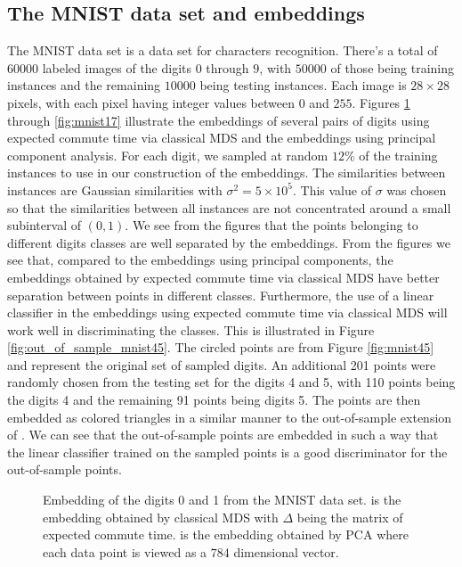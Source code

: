 \subsection{The MNIST data set and embeddings}
The MNIST data set \citep{lecun98:_gradien} is a data set for
characters recognition. There's a total of $60000$ labeled images of
the digits $0$ through $9$, with $50000$ of those being training
instances and the remaining $10000$ being testing instances. Each
image is $28 \times 28$ pixels, with each pixel having integer values
between $0$ and $255$. Figures \ref{fig:mnist01} through
\ref{fig:mnist17} illustrate the embeddings of several pairs of digits
using expected commute time via classical MDS and the embeddings using
principal component analysis. For each digit, we sampled at random
$12$\% of the training instances to use in our construction of the
embeddings. The similarities between instances are Gaussian
similarities with $\sigma^2 = 5 \times 10^5$. This value of $\sigma$
was chosen so that the similarities between all instances are not
concentrated around a small subinterval of $(0,1)$. We see from the
figures that the points belonging to different digits classes are well
separated by the embeddings. From the figures we see that, compared to
the embeddings using principal components, the embeddings obtained by
expected commute time via classical MDS have better separation between
points in different classes.  Furthermore, the use of a linear
classifier in the embeddings using expected commute time via classical
MDS will work well in discriminating the classes. This is illustrated
in Figure \ref{fig:out_of_sample_mnist45}. The circled points are from
Figure \ref{fig:mnist45} and represent the original set of sampled
digits. An additional 201 points were randomly chosen from the testing
set for the digits 4 and 5, with 110 points being the digits 4 and the
remaining 91 points being digits 5. The points are then embedded as
colored triangles in a similar manner to the out-of-sample extension
of \citet{bengio04:_out_lle_isomap_mds_eigen}. We can see that the
out-of-sample points are embedded in such a way that the linear
classifier trained on the sampled points is a good discriminator for
the out-of-sample points.
\begin{figure}[htbp]
  \begin{center}
  \caption{Embedding of the digits 0 and 1 from the MNIST data
    set.  is the embedding obtained by
    classical MDS with $\Delta$ being the matrix of expected commute
    time.  is the embedding obtained by
    PCA where each data point is viewed as a $784$ dimensional vector.
    }
  \label{fig:mnist01}
  \end{center}
\end{figure}    

